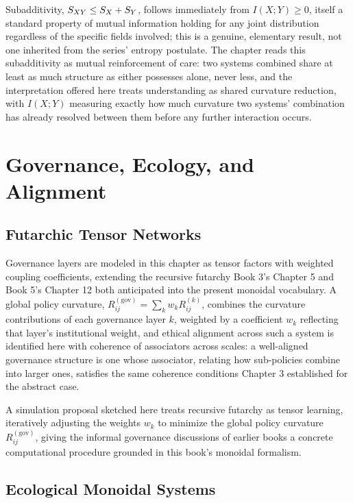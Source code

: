Subadditivity, $S_{XY} \leq S_X + S_Y$, follows immediately from $I(X;Y) \geq 0$, itself a standard property of mutual information holding for any joint distribution regardless of the specific fields involved; this is a genuine, elementary result, not one inherited from the series' entropy postulate. The chapter reads this subadditivity as mutual reinforcement of care: two systems combined share at least as much structure as either possesses alone, never less, and the interpretation offered here treats understanding as shared curvature reduction, with $I(X;Y)$ measuring exactly how much curvature two systems' combination has already resolved between them before any further interaction occurs.

\part{Governance, Ecology, and Alignment}

\chapter{Futarchic Tensor Networks}

Governance layers are modeled in this chapter as tensor factors with weighted coupling coefficients, extending the recursive futarchy Book 3's Chapter 5 and Book 5's Chapter 12 both anticipated into the present monoidal vocabulary. A global policy curvature, $R^{(\text{gov})}_{ij} = \sum_k w_k R^{(k)}_{ij}$, combines the curvature contributions of each governance layer $k$, weighted by a coefficient $w_k$ reflecting that layer's institutional weight, and ethical alignment across such a system is identified here with coherence of associators across scales: a well-aligned governance structure is one whose associator, relating how sub-policies combine into larger ones, satisfies the same coherence conditions Chapter 3 established for the abstract case.

A simulation proposal sketched here treats recursive futarchy as tensor learning, iteratively adjusting the weights $w_k$ to minimize the global policy curvature $R^{(\text{gov})}_{ij}$, giving the informal governance discussions of earlier books a concrete computational procedure grounded in this book's monoidal formalism.

\chapter{Ecological Monoidal Systems}

